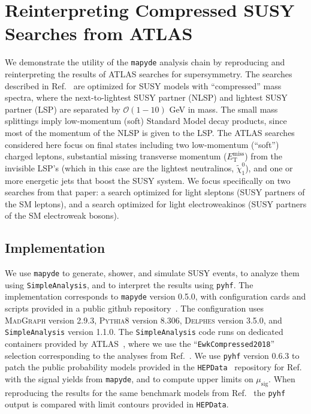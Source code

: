 \documentclass{article}
\newcommand{\chioz}{\ensuremath{\widetilde{\chi}_{1}^{0}}}
\newcommand{\met}{\ensuremath{E_{\mathrm{T}}^{\mathrm{miss}}}}
\newcommand{\mapyde}{\texttt{mapyde}}
\newcommand{\simpleanalysis}{\texttt{SimpleAnalysis}}
\newcommand{\madgraph}{\textsc{MadGraph}}
\newcommand{\pythia}{\textsc{Pythia8}}
\newcommand{\delphes}{\textsc{Delphes}}
\newcommand{\pyhf}{\texttt{pyhf}}
\newcommand{\musig}{\ensuremath{\mu_{\mathrm{sig}}}}
\newcommand{\hepdata}{\texttt{HEPData}}
\begin{document}
\section{Reinterpreting Compressed SUSY Searches from ATLAS}
\label{sec:reinterpreting-compressed-susy-searches-from-atlas}

We demonstrate the utility of the \mapyde{} analysis chain by reproducing and reinterpreting the results of ATLAS searches for supersymmetry.  The searches described in Ref.~\cite{ATLAS:2019lng} are optimized for SUSY models with \enquote{compressed} mass spectra, where the next-to-lightest SUSY partner (NLSP) and lightest SUSY partner (LSP) are separated by $\mathcal{O}(1-10)$ GeV in mass.  The small mass splittings imply low-momentum (soft) Standard Model decay products, since most of the momentum of the NLSP is given to the LSP.  The ATLAS searches considered here focus on final states including two low-momentum (\enquote{soft}) charged leptons, substantial missing transverse momentum (\met) from the invisible LSP's (which in this case are the lightest neutralinos, \chioz), and one or more energetic jets that boost the SUSY system.  We focus specifically on two searches from that paper: a search optimized for light sleptons (SUSY partners of the SM leptons), and a search optimized for light electroweakinos (SUSY partners of the SM electroweak bosons).

\subsection{Implementation}
\label{ssec:implementation}

We use \mapyde{} to generate, shower, and simulate SUSY events, to analyze them using \simpleanalysis, and to interpret the results using \pyhf.  The implementation corresponds to \mapyde{} version 0.5.0, with configuration cards and scripts provided in a public github repository~\cite{mapyde-user}.  The configuration uses \madgraph{} version 2.9.3, \pythia{} version 8.306, \delphes{} version 3.5.0, and \simpleanalysis{} version 1.1.0.  The \simpleanalysis{} code runs on dedicated containers provided by ATLAS~\cite{SAGitLabRegistry}, where we use the \enquote{\texttt{EwkCompressed2018}} selection corresponding to the analyses from Ref.~\cite{ATLAS:2019lng}.  We use \pyhf{} version 0.6.3 to patch the public probability models provided in the \hepdata~\cite{HepData} repository for Ref.~\cite{ATLAS:2019lng} with the signal yields from \mapyde, and to compute upper limits on \musig.  When reproducing the results for the same benchmark models from Ref.~\cite{ATLAS:2019lng} the \pyhf{} output is compared with limit contours provided in \hepdata.
\end{document}
